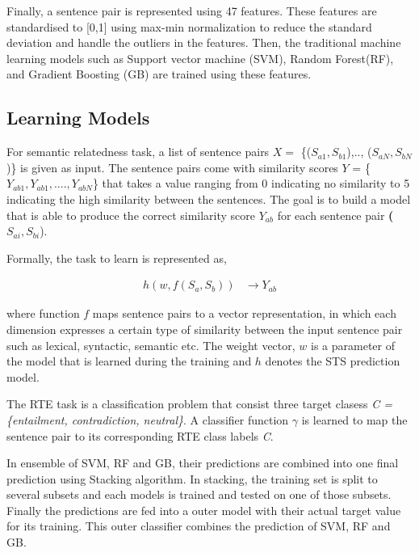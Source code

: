 \documentclass[12pt]{report} %
\begin{document}
	Finally, a sentence pair is represented using 47 features. These features are standardised to [0,1] using max-min normalization to reduce the standard deviation and handle the outliers in the features. Then, the traditional machine learning models such as Support vector machine (SVM), Random Forest(RF), and Gradient Boosting (GB) are trained using these features.
	
	\subsection{Learning Models}  
	
	For semantic relatedness task, a list of sentence pairs $X =$ \{($S_{a1},S_{b1}$),.., ($S_{aN},S_{bN}$)\} is given as input. The sentence pairs come with similarity scores $Y$ = \{$Y_{ab1}, Y_{ab1},...., Y_{abN}$\} that takes a value ranging from 0 indicating no similarity to 5 indicating the high similarity between the sentences. The goal is to build a model that is able to produce the correct similarity score $Y_{ab}$ for each sentence pair \textbf($S_{ai},S_{bi}$).
	
	Formally, the task to learn is represented as,
	
	\begin{align} 
	h(w,f(S_a,S_b))  & \rightarrow Y_{ab} 
	\end{align}
	
	where function $f$ maps sentence pairs to a vector
	representation, in which each dimension expresses a certain type of
	similarity between the input sentence pair such as lexical, syntactic, semantic etc. The weight vector,
	$w$ is a parameter of the model that is learned during the training and $h$ denotes the STS prediction model.
	
	The RTE task is a classification problem that consist three target clasess  \textit{ C =\{entailment, contradiction, neutral\}}. A classifier function $\gamma$ is learned to map the sentence pair to its corresponding RTE class labels \textit{C}.
	
	In ensemble of SVM, RF and GB, their predictions are combined into one final prediction using Stacking algorithm. In stacking, the training set is split to several subsets and each models is trained and tested on one of those subsets. Finally the predictions are fed into a outer model with their actual target value for its training. This outer classifier combines the prediction of SVM, RF and GB.
	
	
\end{document}
